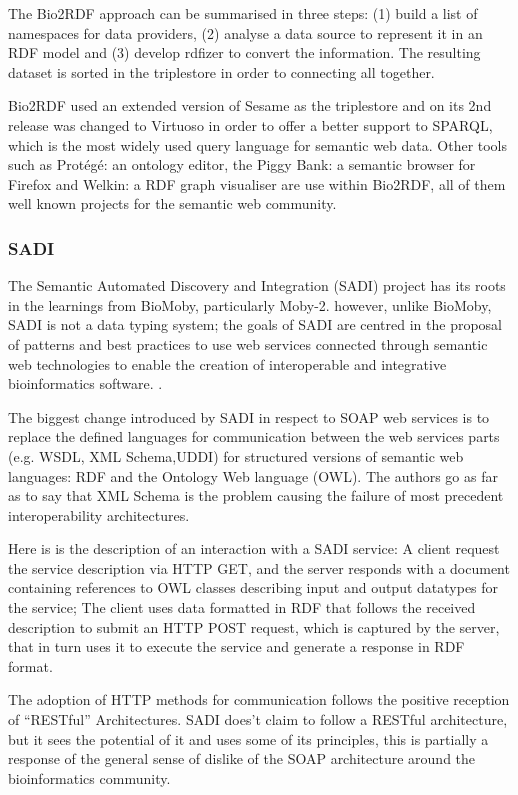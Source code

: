 The Bio2RDF approach can be summarised in three steps: (1) build a list of namespaces for data providers, (2) analyse a data source to represent it in an RDF model and (3) develop rdfizer to convert the information. The resulting dataset is sorted in the triplestore in order to connecting all together.

Bio2RDF used an extended version of Sesame as the triplestore and on its 2nd release was changed to Virtuoso in order to offer a better support to SPARQL, which is the most widely used query language for semantic web data. Other tools such as Protégé: an ontology editor, the Piggy Bank: a semantic browser for Firefox and Welkin: a RDF graph visualiser are use within Bio2RDF, all of them well known projects for the semantic web community.
 
 

\subsubsection{SADI}
The Semantic Automated Discovery and Integration (SADI) project has its roots in the learnings from BioMoby, particularly  Moby-2. however, unlike BioMoby, SADI is not a data typing system; the goals of SADI are centred in the proposal of patterns and best practices to use web services connected through semantic web technologies to enable the creation of interoperable and integrative bioinformatics software. \cite{WIL2011}.

The biggest change introduced by SADI in respect to SOAP web services is to replace the defined languages for communication between the web services parts (e.g. WSDL, XML Schema,UDDI) for structured versions of semantic web languages: RDF and the Ontology Web language (OWL). The authors go as far as to say that XML Schema is the problem causing the failure of most precedent interoperability architectures.

Here is is the description of an interaction with a SADI service: A client request the service description via HTTP GET, and the server responds with a document containing references to OWL classes describing input and output datatypes for the service; The client uses data formatted in RDF that follows the received description to submit an HTTP POST request, which is captured by the server, that in turn uses it to execute the service and generate a response in RDF format.

The adoption of HTTP methods for communication follows the positive reception of ``RESTful'' Architectures. SADI does't claim to follow a RESTful architecture, but it sees the potential of it and uses some of its principles, this is partially a response of the general sense of dislike of the SOAP architecture around the bioinformatics community.

